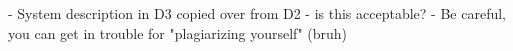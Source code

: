 - System description in D3 copied over from D2 - is this acceptable?
    - Be careful, you can get in trouble for "plagiarizing yourself" (bruh)
